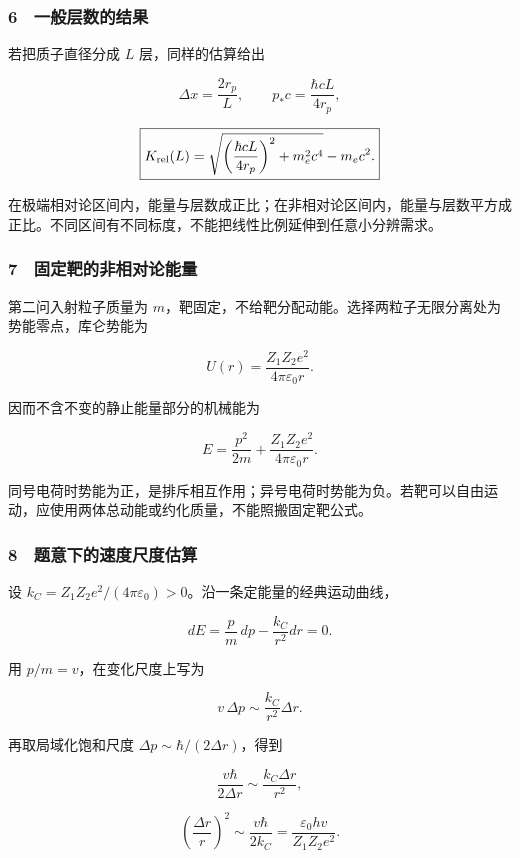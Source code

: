 \documentclass[12pt,a4paper,fontset=fandol]{ctexart}
\begin{document}
\subsubsection{6　一般层数的结果}\label{ux4e00ux822cux5c42ux6570ux7684ux7ed3ux679c}

若把质子直径分成 \(L\) 层，同样的估算给出

\[\Delta x=\frac{2r_p}{L},
\qquad p_*c=\frac{\hbar cL}{4r_p},\]

\[\boxed{K_{\rm rel}(L)
=\sqrt{\left(\frac{\hbar cL}{4r_p}\right)^2+m_e^2c^4}
-m_ec^2.}\]

在极端相对论区间内，能量与层数成正比；在非相对论区间内，能量与层数平方成正比。不同区间有不同标度，不能把线性比例延伸到任意小分辨需求。

\subsubsection{7　固定靶的非相对论能量}\label{ux56faux5b9aux9776ux7684ux975eux76f8ux5bf9ux8bbaux80fdux91cf}

第二问入射粒子质量为
\(m\)，靶固定，不给靶分配动能。选择两粒子无限分离处为势能零点，库仑势能为

\[U(r)=\frac{Z_1Z_2e^2}{4\pi\varepsilon_0r}.\]

因而不含不变的静止能量部分的机械能为

\[\boxed{E=\frac{p^2}{2m}
+\frac{Z_1Z_2e^2}{4\pi\varepsilon_0r}.}\]

同号电荷时势能为正，是排斥相互作用；异号电荷时势能为负。若靶可以自由运动，应使用两体总动能或约化质量，不能照搬固定靶公式。

\subsubsection{8　题意下的速度尺度估算}\label{ux9898ux610fux4e0bux7684ux901fux5ea6ux5c3aux5ea6ux4f30ux7b97}

设 \(k_C=Z_1Z_2e^2/(4\pi\varepsilon_0)>0\)。沿一条定能量的经典运动曲线，

\[dE=\frac pm\,dp-\frac{k_C}{r^2}dr=0.\]

用 \(p/m=v\)，在变化尺度上写为

\[v\,\Delta p\sim\frac{k_C}{r^2}\Delta r.\]

再取局域化饱和尺度 \(\Delta p\sim\hbar/(2\Delta r)\)，得到

\[\frac{v\hbar}{2\Delta r}
\sim\frac{k_C\Delta r}{r^2},\]

\[\boxed{\left(\frac{\Delta r}{r}\right)^2
\sim\frac{v\hbar}{2k_C}
=\frac{\varepsilon_0hv}{Z_1Z_2e^2}.}\]
\end{document}
